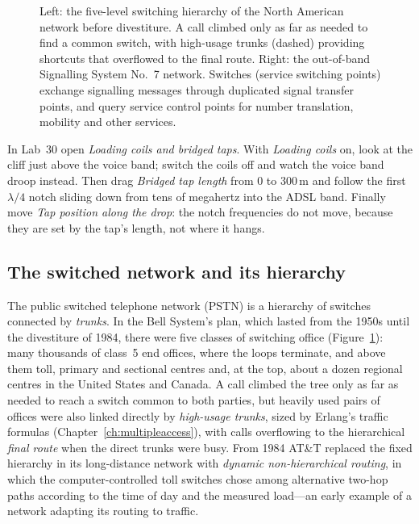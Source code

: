 \begin{figure}[H]
\caption{Left: the five-level switching hierarchy of the North American network before divestiture.
A call climbed only as far as needed to find a common switch, with high-usage trunks (dashed)
providing shortcuts that overflowed to the final route. Right: the out-of-band Signalling System
No.~7 network. Switches (service switching points) exchange signalling messages through duplicated
signal transfer points, and query service control points for number translation, mobility and
other services.}
\label{fig:ch24_pstn}
\end{figure}

\begin{tryit}
In Lab~30 open \emph{Loading coils and bridged taps}. With \emph{Loading coils} on, look at the
cliff just above the voice band; switch the coils off and watch the voice band droop instead. Then
drag \emph{Bridged tap length} from 0 to 300\,m and follow the first $\lambda/4$ notch sliding down
from tens of megahertz into the ADSL band. Finally move \emph{Tap position along the drop}: the
notch frequencies do not move, because they are set by the tap's length, not where it hangs.
\end{tryit}

\subsection{The switched network and its hierarchy}



The public switched telephone network (PSTN) is a hierarchy of switches connected by \emph{trunks}.
In the Bell System's plan, which lasted from the 1950s until the divestiture of 1984, there were five
classes of switching office (Figure~\ref{fig:ch24_pstn}): many thousands of class~5 end offices,
where the loops terminate, and above them toll, primary and sectional centres and, at the top, about
a dozen regional centres in the United States and Canada. A call climbed the
tree only as far as needed to reach a switch common to both parties, but heavily used pairs of offices
were also linked directly by \emph{high-usage trunks}, sized by Erlang's traffic formulas
(Chapter~\ref{ch:multipleaccess}), with calls overflowing to the hierarchical \emph{final route}
when the direct trunks were busy. From 1984 AT\&T replaced the fixed hierarchy in its long-distance
network with \emph{dynamic non-hierarchical routing}, in which the computer-controlled toll switches
chose among alternative two-hop paths according to the time of day and the measured load---an early
example of a network adapting its routing to traffic.

